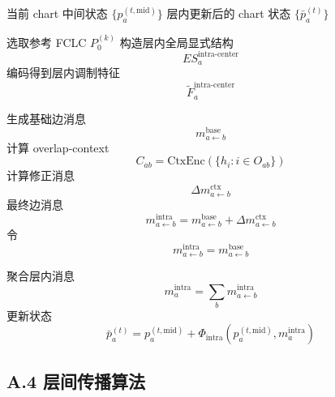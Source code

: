 \documentclass[12pt,a4paper]{ctexart}
\begin{document}
\begin{algorithm}[H]
\caption{Intra-layer Chart Propagation}
\begin{algorithmic}[1]
\Require 当前 chart 中间状态 \(\{p_a^{(t,\mathrm{mid})}\}\)
\Ensure 层内更新后的 chart 状态 \(\{\bar p_a^{(t)}\}\)

    \State 选取参考 FCLC \(P_0^{(k)}\)
        \State 构造层内全局显式结构
        \[
        ES_a^{\mathrm{intra\text{-}center}}
        \]
        \State 编码得到层内调制特征
        \[
        \tilde F_a^{\mathrm{intra\text{-}center}}
        \]
    \EndFor

        \State 生成基础边消息
        \[
        m_{a\leftarrow b}^{\mathrm{base}}
        \]
            \State 计算 overlap-context
            \[
            C_{ab}=\mathrm{CtxEnc}(\{h_i:i\in O_{ab}\})
            \]
            \State 计算修正消息
            \[
            \Delta m_{a\leftarrow b}^{\mathrm{ctx}}
            \]
            \State 最终边消息
            \[
            m_{a\leftarrow b}^{\mathrm{intra}}
            =
            m_{a\leftarrow b}^{\mathrm{base}}
            +
            \Delta m_{a\leftarrow b}^{\mathrm{ctx}}
            \]
        \Else
            \State 令
            \[
            m_{a\leftarrow b}^{\mathrm{intra}}
            =
            m_{a\leftarrow b}^{\mathrm{base}}
            \]
        \EndIf
    \EndFor

        \State 聚合层内消息
        \[
        m_a^{\mathrm{intra}}=\sum_b m_{a\leftarrow b}^{\mathrm{intra}}
        \]
        \State 更新状态
        \[
        \bar p_a^{(t)}
        =
        p_a^{(t,\mathrm{mid})}
        +
        \Phi_{\mathrm{intra}}
        (
        p_a^{(t,\mathrm{mid})},
        m_a^{\mathrm{intra}}
        )
        \]
    \EndFor
\EndFor
\end{algorithmic}
\end{algorithm}

\subsection{A.4 层间传播算法}
\end{document}
